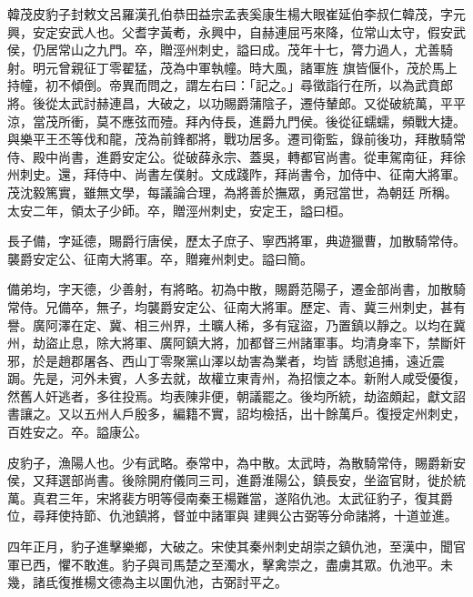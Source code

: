 
\begin{pinyinscope}

 韓茂皮豹子封敕文呂羅漢孔伯恭田益宗孟表奚康生楊大眼崔延伯李叔仁韓茂，字元興，安定安武人也。父耆字黃耇，永興中，自赫連屈丐來降，位常山太守，假安武侯，仍居常山之九門。卒，贈涇州刺史，謚曰成。茂年十七，膂力過人，尤善騎射。明元曾親征丁零翟猛，茂為中軍執幢。時大風，諸軍旌
 旗皆偃仆，茂於馬上持幢，初不傾倒。帝異而問之，謂左右曰：「記之。」尋徵詣行在所，以為武賁郎將。後從太武討赫連昌，大破之，以功賜爵蒲陰子，遷侍輦郎。又從破統萬，平平涼，當茂所衝，莫不應弦而殪。拜內侍長，進爵九門侯。後從征蠕蠕，頻戰大捷。與樂平王丕等伐和龍，茂為前鋒都將，戰功居多。遷司衛監，錄前後功，拜散騎常侍、殿中尚書，進爵安定公。從破薛永宗、蓋吳，轉都官尚書。從車駕南征，拜徐州刺史。還，拜侍中、尚書左僕射。文成踐阼，拜尚書令，加侍中、征南大將軍。茂沈毅篤實，雖無文學，每議論合理，為將善於撫眾，勇冠當世，為朝廷
 所稱。太安二年，領太子少師。卒，贈涇州刺史，安定王，謚曰桓。



 長子備，字延德，賜爵行唐侯，歷太子庶子、寧西將軍，典遊獵曹，加散騎常侍。襲爵安定公、征南大將軍。卒，贈雍州刺史。謚曰簡。



 備弟均，字天德，少善射，有將略。初為中散，賜爵范陽子，遷金部尚書，加散騎常侍。兄備卒，無子，均襲爵安定公、征南大將軍。歷定、青、冀三州刺史，甚有譽。廣阿澤在定、冀、相三州界，土曠人稀，多有寇盜，乃置鎮以靜之。以均在冀州，劫盜止息，除大將軍、廣阿鎮大將，加都督三州諸軍事。均清身率下，禁斷奸邪，於是趙郡屠各、西山丁零聚黨山澤以劫害為業者，均皆
 誘慰追捕，遠近震跼。先是，河外未賓，人多去就，故權立東青州，為招懷之本。新附人咸受優復，然舊人奸逃者，多往投焉。均表陳非便，朝議罷之。後均所統，劫盜頗起，獻文詔書讓之。又以五州人戶殷多，編籍不實，詔均檢括，出十餘萬戶。復授定州刺史，百姓安之。卒。謚康公。



 皮豹子，漁陽人也。少有武略。泰常中，為中散。太武時，為散騎常侍，賜爵新安侯，又拜選部尚書。後除開府儀同三司，進爵淮陽公，鎮長安，坐盜官財，徙於統萬。真君三年，宋將裴方明等侵南秦王楊難當，遂陷仇池。太武征豹子，復其爵位，尋拜使持節、仇池鎮將，督並中諸軍與
 建興公古弼等分命諸將，十道並進。



 四年正月，豹子進擊樂鄉，大破之。宋使其秦州刺史胡崇之鎮仇池，至漢中，聞官軍已西，懼不敢進。豹子與司馬楚之至濁水，擊禽崇之，盡虜其眾。仇池平。未幾，諸氐復推楊文德為主以圍仇池，古弼討平之。




\end{pinyinscope}
